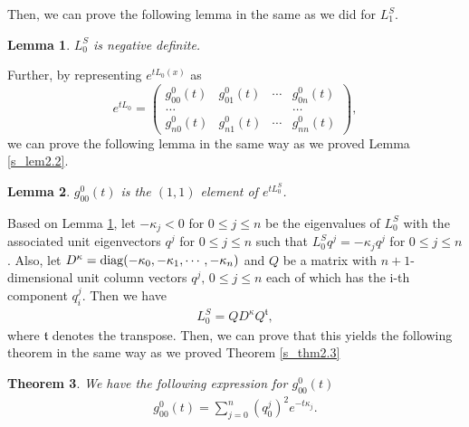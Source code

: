 \documentclass[a4paper,12pt]{article}
\newtheorem{Th}{Theorem}[section]
\newtheorem{lemma}[Th]{Lemma}
\newtheorem{a priori condition}[Th]{A priori condition}
\begin{document}
\medskip
\noindent
Then, we can prove the following lemma in the same as we did for $L_1^S$.

\begin{lemma}\label{s_lem2.4}
$L_0^S$ is negative definite.
\end{lemma}

\medskip
\noindent
Further, by representing
$e^{tL_0(x)}$ as
\begin{equation}\label{s2.23}
e^{tL_0}=
\begin{pmatrix}
g^0_{00}(t)&g^0_{01}(t)&\cdots&g^0_{0n}(t)\\
\ldots& & &\ldots\\
g^0_{n0}(t)&g^0_{n1}(t)&\cdots&g^0_{nn}(t)
\end{pmatrix},
\end{equation}
we can prove the following lemma in the same way as we proved Lemma \ref{s_lem2.2}.
\begin{lemma}\label{s_lem2.5}
$g^0_{00}(t)$ is the $(1,1)$ element of $e^{tL_0^S}$. 
\end{lemma}

\medskip
\noindent
Based on Lemma \ref{s_lem2.4}, let $-\kappa_j<0$ for $0\leq j\leq n$ be the eigenvalues of $L_0^S$ with the associated unit eigenvectors $q^j$ for $0\leq j\leq n$ such that
$L_0^Sq^j=-\kappa_j q^j$ for $0\leq j\leq n$. Also, let
$D^{\kappa}={\rm diag}(-\kappa_0,-\kappa_1,\cdots,-\kappa_n)$ and $Q$ be a matrix with $n+1$-dimensional unit column vectors $q^j,\,0\le j\le n$ each of which has the i-th component $q_i^j$. Then we have
\begin{equation}\label{s2.24}
\begin{aligned}
L_0^S=QD^{\kappa}Q^{\mathfrak{t}},
\end{aligned}
\end{equation}
where $\mathfrak{t}$ denotes the transpose.
\medskip\noindent
Then, we can prove that this yields the following theorem in the same way as we proved Theorem \ref{s_thm2.3}

\begin{Th}\label{s_thm2.6}
We have the following expression for $g_{00}^0(t)$
\begin{equation}\label{s2.25}
\begin{aligned}
g^0_{00}(t)=\sum_{j=0}^n(q_0^j)^2e^{-t\kappa_j}.
\end{aligned}
\end{equation}
\end{Th}
\end{document}
